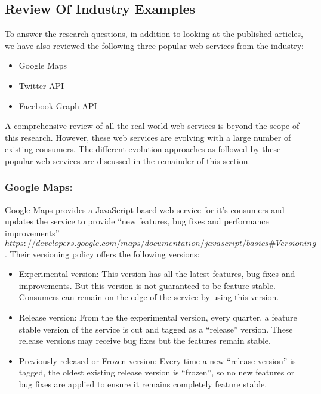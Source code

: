 \documentclass[runningheads,a4paper]{llncs}
\begin{document}


\subsection{Review Of Industry Examples} %
\label{sub:review_of_industry_examples}

To answer the research questions, in addition to looking at the published articles, we have also reviewed the following three popular web services from the industry:

\begin{itemize}
  \item Google Maps
  \item Twitter API
  \item Facebook Graph API
\end{itemize}

A comprehensive review of all the real world web services is beyond the scope of this research. However, these web services are evolving with a large number of existing consumers. The different evolution approaches as followed by these popular web services are discussed in the remainder of this section.

\subsubsection{Google Maps:}
Google Maps provides a JavaScript based web service for it’s consumers and updates the service to provide ``new features, bug fixes and performance improvements'' \[https://developers.google.com/maps/documentation/javascript/basics\#Versioning\]. Their versioning policy offers the following versions:

\begin{itemize}
  \item Experimental version: This version has all the latest features, bug fixes and improvements. But this version is not guaranteed to be feature stable. Consumers can remain on the edge of the service by using this version.
  \item Release version: From the the experimental version, every quarter, a feature stable version of the service is cut and tagged as a ``release'' version. These release versions may receive bug fixes but the features remain stable.
  \item Previously released or Frozen version: Every time a new ``release version'' is tagged, the oldest existing release version is ``frozen'', so no new features or bug fixes are applied to ensure it remains completely feature stable.
\end{itemize}
\end{document}
